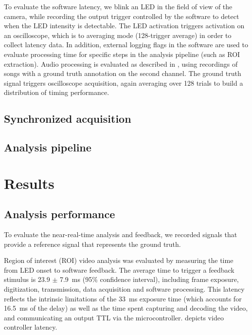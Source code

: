 To evaluate the software latency, we blink an LED in the 
field of view of the camera, while recording the output trigger 
controlled by the software to detect when the LED intensity is 
detectable. The LED activation triggers activation on an 
oscilloscope, which is to averaging mode (128-trigger average) 
in order to collect latency data. In addition, external logging
flags in the software are used to evaluate processing time for 
specific steps in the analysis pipeline (such as ROI extraction).
Audio processing is evaluated as described in \cite{Pearre:2017cs},
using recordings of songs with a ground truth annotation on the 
second channel. The ground truth signal triggers oscilloscope 
acquisition, again averaging over 128 trials to build a distribution 
of timing performance.

\subsection{Synchronized acquisition}


\subsection{Analysis pipeline}


\section{Results}


\subsection{Analysis performance}

To evaluate the near-real-time analysis and feedback, we recorded 
signals that provide a reference signal that represents the 
ground truth. 

Region of interest (ROI) video analysis was evaluated by measuring the
time from LED onset to software feedback. The average time to trigger 
a feedback stimulus is 23.9 $\pm$ 7.9~ms (95\% confidence interval), 
including frame exposure, digitization, transmission, data acquisition 
and software processing. This latency reflects the intrinsic 
limitations of the 33~ms exposure time (which accounts for 16.5~ms of 
the delay) as well as the time spent capturing and decoding the video, 
and communicating an output TTL via the microcontroller. 
 depicts video controller latency.

